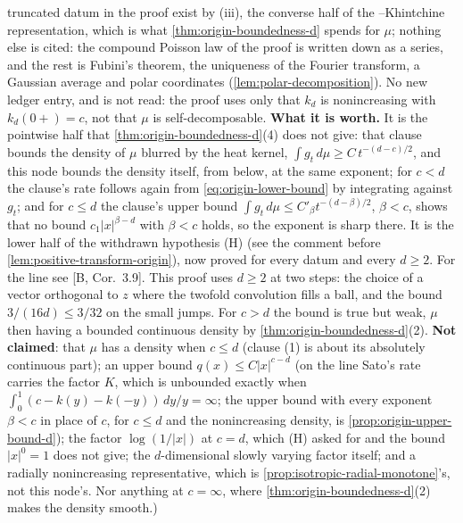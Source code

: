 \begin{proposition}
{truncated datum in the proof exist by (iii), the converse half of the \Levy--Khintchine
representation, which is what \ref{thm:origin-boundedness-d} spends for $\mu$; nothing else is
cited: the compound Poisson law of the proof is written down as a series, and the rest is
Fubini's theorem, the uniqueness of the Fourier transform, a Gaussian average and polar
coordinates (\ref{lem:polar-decomposition}). No new ledger entry, and  is not read: the proof uses
only that $k_d$ is nonincreasing with $k_d(0{+}) = c$, not that $\mu$ is self-decomposable.
\textbf{What it is worth.} It is the pointwise half that \ref{thm:origin-boundedness-d}(4) does not
give: that clause bounds the density of $\mu$ blurred by the heat kernel, $\int g_t\,d\mu \ge
C\,t^{-(d-c)/2}$, and this node bounds the density itself, from below, at the same exponent; for
$c < d$ the clause's rate follows again from \ref{eq:origin-lower-bound} by integrating against
$g_t$; and for $c \le d$ the clause's upper bound $\int g_t\,d\mu \le C'_\beta t^{-(d-\beta)/2}$,
$\beta < c$, shows that no bound $c_1|x|^{\beta-d}$ with $\beta < c$ holds, so the exponent is sharp
there. It is the lower half
of the withdrawn hypothesis (H) (see the comment before \ref{lem:positive-transform-origin}),
now proved for every datum and every $d \ge 2$. For the line see [B, Cor.~3.9]. This proof uses
$d \ge 2$ at two steps: the choice of a vector orthogonal to $z$ where the twofold convolution fills
a ball, and the bound $3/(16d) \le 3/32$ on the small jumps. For $c > d$ the bound is true
but weak, $\mu$ then having a bounded continuous density by \ref{thm:origin-boundedness-d}(2).
\textbf{Not claimed}: that $\mu$ has a density when $c \le d$ (clause (1) is about its absolutely
continuous part); an upper bound $q(x) \le C|x|^{c-d}$ (on the line Sato's rate carries the factor
$K$, which is unbounded exactly when $\int_0^1(c - k(y) - k(-y))\,dy/y = \infty$; the upper bound
with every exponent $\beta < c$ in place of $c$, for $c \le d$ and the nonincreasing density, is
\ref{prop:origin-upper-bound-d}); the factor
$\log(1/|x|)$ at $c = d$, which (H) asked for and the bound $|x|^0 = 1$ does not give; the
$d$-dimensional slowly varying factor itself; and a radially nonincreasing representative, which
is \ref{prop:isotropic-radial-monotone}'s, not this node's. Nor
anything at $c = \infty$, where \ref{thm:origin-boundedness-d}(2) makes the density smooth.)}
\end{proposition}

